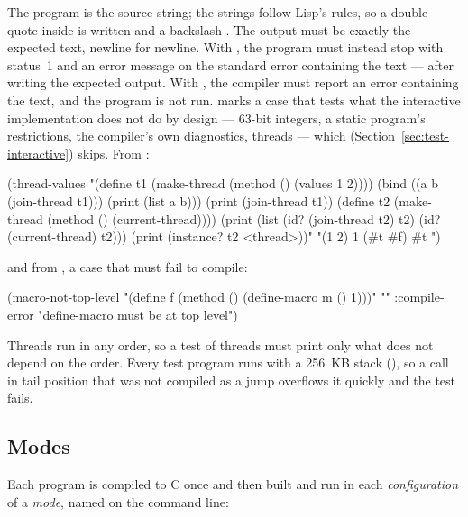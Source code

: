 The program is the source string; the strings follow Lisp's rules, so a
double quote inside is written  and a backslash
\code{\textbackslash\textbackslash}. The output must be exactly the
expected text, newline for newline. With , the program must
instead stop with status~1 and an error message on the standard error
containing the text --- after writing the expected output. With
, the compiler must report an error containing the
text, and the program is not run.  marks a case
that tests what the interactive implementation does not do by design ---
63-bit integers, a static program's restrictions, the compiler's own
diagnostics, threads --- which 
(Section~\ref{sec:test-interactive}) skips. From
:

\begin{lisp}
 (thread-values
  "(define t1 (make-thread (method () (values 1 2))))
   (bind ((a b (join-thread t1))) (print (list a b)))
   (print (join-thread t1))
   (define t2 (make-thread (method () (current-thread))))
   (print (list (id? (join-thread t2) t2) (id? (current-thread) t2)))
   (print (instance? t2 <thread>))"
  "(1 2)
1
(#t #f)
#t
")
\end{lisp}

\noindent and from , a case that must fail to
compile:

\begin{lisp}
 (macro-not-top-level
  "(define f (method () (define-macro m () 1)))"
  ""
  :compile-error "define-macro must be at top level")
\end{lisp}

Threads run in any order, so a test of threads must print only what does
not depend on the order. Every test program runs with a 256~KB stack
(), so a call in tail position that was not compiled
as a jump overflows it quickly and the test fails.

\subsection{Modes}\label{sec:test-modes}

Each program is compiled to C once and then built and run in each
\emph{configuration} of a \emph{mode}, named on the command line:

